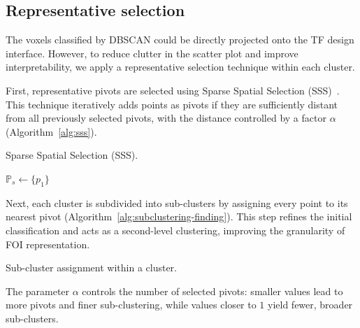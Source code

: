 \subsection{Representative selection}
\label{subsect:representative-selection}

The voxels classified by DBSCAN could be directly projected onto the TF design interface. However, to reduce clutter in the scatter plot and improve interpretability, we apply a representative selection technique within each cluster.

First, representative pivots are selected using Sparse Spatial Selection (SSS)~\cite{pedreira2007}. This technique iteratively adds points as pivots if they are sufficiently distant from all previously selected pivots, with the distance controlled by a factor $\alpha$ (Algorithm~\ref{alg:sss}).

\begin{algorithm}
    \caption{Sparse Spatial Selection (SSS).}
    \label{alg:sss}
    $\mathbb{P}_s \gets \{p_1\}$ \\
\end{algorithm}

Next, each cluster is subdivided into sub-clusters by assigning every point to its nearest pivot (Algorithm~\ref{alg:subclustering-finding}). This step refines the initial classification and acts as a second-level clustering, improving the granularity of FOI representation.

\begin{algorithm}
    \caption{Sub-cluster assignment within a cluster.}
    \label{alg:subclustering-finding}
\end{algorithm}

The parameter $\alpha$ controls the number of selected pivots: smaller values lead to more pivots and finer sub-clustering, while values closer to $1$ yield fewer, broader sub-clusters.
